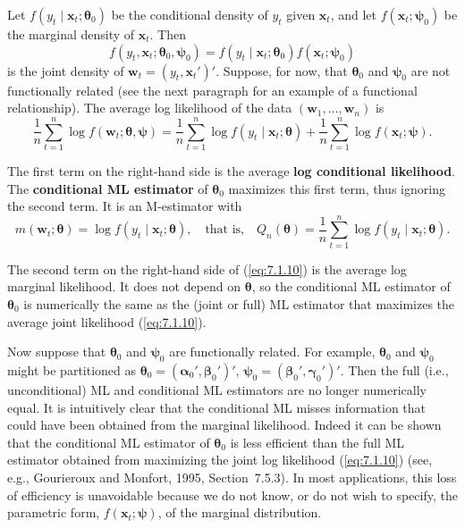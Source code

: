 Let $f(y_t \mid \mathbf{x}_t; \bm{\theta}_0)$ be the conditional density of $y_t$ given $\mathbf{x}_t$, and let $f(\mathbf{x}_t; \bm{\psi}_0)$ be the marginal density of $\mathbf{x}_t$. Then
\begin{equation}
\label{eq:7.1.9}
f(y_t, \mathbf{x}_t; \bm{\theta}_0, \bm{\psi}_0) = f(y_t \mid \mathbf{x}_t; \bm{\theta}_0) f(\mathbf{x}_t; \bm{\psi}_0)
\end{equation}
is the joint density of $\mathbf{w}_t = (y_t, \mathbf{x}_t')'$. Suppose, for now, that $\bm{\theta}_0$ and $\bm{\psi}_0$ are not functionally related (see the next paragraph for an example of a functional relationship). The average log likelihood of the data $(\mathbf{w}_1, \ldots, \mathbf{w}_n)$ is
\begin{equation}
\label{eq:7.1.10}
\frac{1}{n} \sum_{t=1}^{n} \log f(\mathbf{w}_t; \bm{\theta}, \bm{\psi}) = \frac{1}{n} \sum_{t=1}^{n} \log f(y_t \mid \mathbf{x}_t; \bm{\theta}) + \frac{1}{n} \sum_{t=1}^{n} \log f(\mathbf{x}_t; \bm{\psi}).
\end{equation}

The first term on the right-hand side is the average \textbf{log conditional likelihood}. The \textbf{conditional ML estimator} of $\bm{\theta}_0$ maximizes this first term, thus ignoring the second term. It is an M-estimator with
\begin{equation}
\label{eq:7.1.11}
m(\mathbf{w}_t; \bm{\theta}) = \log f(y_t \mid \mathbf{x}_t; \bm{\theta}), \quad \text{that is,} \quad Q_n(\bm{\theta}) = \frac{1}{n} \sum_{t=1}^{n} \log f(y_t \mid \mathbf{x}_t; \bm{\theta}).
\end{equation}

The second term on the right-hand side of (\ref{eq:7.1.10}) is the average log marginal likelihood. It does not depend on $\bm{\theta}$, so the conditional ML estimator of $\bm{\theta}_0$ is numerically the same as the (joint or full) ML estimator that maximizes the average joint likelihood (\ref{eq:7.1.10}).

Now suppose that $\bm{\theta}_0$ and $\bm{\psi}_0$ are functionally related. For example, $\bm{\theta}_0$ and $\bm{\psi}_0$ might be partitioned as $\bm{\theta}_0 = (\bm{\alpha}_0', \bm{\beta}_0')'$, $\bm{\psi}_0 = (\bm{\beta}_0', \bm{\gamma}_0')'$. Then the full (i.e., unconditional) ML and conditional ML estimators are no longer numerically equal. It is intuitively clear that the conditional ML misses information that could have been obtained from the marginal likelihood. Indeed it can be shown that the conditional ML estimator of $\bm{\theta}_0$ is less efficient than the full ML estimator obtained from maximizing the joint log likelihood (\ref{eq:7.1.10}) (see, e.g., Gourieroux and Monfort, 1995, Section~7.5.3). In most applications, this loss of efficiency is unavoidable because we do not know, or do not wish to specify, the parametric form, $f(\mathbf{x}_t; \bm{\psi})$, of the marginal distribution.

